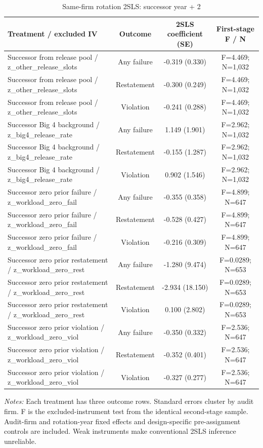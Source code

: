 \begin{table}[htbp]
\footnotesize
\centering
\caption{Same-firm rotation 2SLS: successor year + 2}
\begin{threeparttable}
\begin{tabular}{p{}ccc}
\toprule
Treatment / excluded IV & Outcome & 2SLS coefficient (SE) & First-stage F / N \\
\midrule
Successor from release pool / z\_other\_release\_slots & Any failure & -0.319 (0.330) & F=4.469; N=1,032 \\
Successor from release pool / z\_other\_release\_slots & Restatement & -0.300 (0.249) & F=4.469; N=1,032 \\
Successor from release pool / z\_other\_release\_slots & Violation & -0.241 (0.288) & F=4.469; N=1,032 \\
Successor Big 4 background / z\_big4\_release\_rate & Any failure & 1.149 (1.901) & F=2.962; N=1,032 \\
Successor Big 4 background / z\_big4\_release\_rate & Restatement & -0.155 (1.287) & F=2.962; N=1,032 \\
Successor Big 4 background / z\_big4\_release\_rate & Violation & 0.902 (1.546) & F=2.962; N=1,032 \\
Successor zero prior failure / z\_workload\_zero\_fail & Any failure & -0.355 (0.358) & F=4.899; N=647 \\
Successor zero prior failure / z\_workload\_zero\_fail & Restatement & -0.528 (0.427) & F=4.899; N=647 \\
Successor zero prior failure / z\_workload\_zero\_fail & Violation & -0.216 (0.309) & F=4.899; N=647 \\
Successor zero prior restatement / z\_workload\_zero\_rest & Any failure & -1.280 (9.474) & F=0.0289; N=653 \\
Successor zero prior restatement / z\_workload\_zero\_rest & Restatement & -2.934 (18.150) & F=0.0289; N=653 \\
Successor zero prior restatement / z\_workload\_zero\_rest & Violation & 0.100 (2.802) & F=0.0289; N=653 \\
Successor zero prior violation / z\_workload\_zero\_viol & Any failure & -0.350 (0.332) & F=2.536; N=647 \\
Successor zero prior violation / z\_workload\_zero\_viol & Restatement & -0.352 (0.401) & F=2.536; N=647 \\
Successor zero prior violation / z\_workload\_zero\_viol & Violation & -0.327 (0.277) & F=2.536; N=647 \\
\bottomrule
\end{tabular}
\begin{tablenotes}\footnotesize
\item \raggedright \textit{Notes:} Each treatment has three outcome rows. Standard errors cluster by audit firm. F is the excluded-instrument test from the identical second-stage sample. Audit-firm and rotation-year fixed effects and design-specific pre-assignment controls are included. Weak instruments make conventional 2SLS inference unreliable.
\end{tablenotes}
\end{threeparttable}
\end{table}
